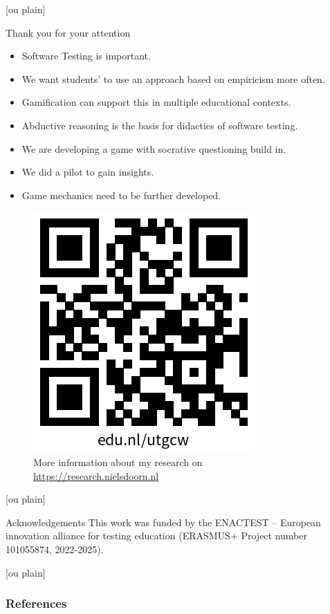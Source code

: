 \documentclass[aspectratio=169]{beamer}
\begin{document}

[ou plain]
\begin{frame}{Thank you for your attention}

\begin{itemize}
    \item Software Testing is important.
    \item We want students' to use an approach based on empiricism more often.
    \item Gamification can support this in multiple educational contexts.
    \item Abductive reasoning is the basis for didactics of software testing.
    \item We are developing a game with socrative questioning build in.
    \item We did a pilot to gain insights.
    \item Game mechanics need to be further developed.
\end{itemize}

\begin{figure}
    \centering
    \includegraphics[width=0.25\linewidth]{images//qr.png}
    \caption{More information about my research on \url{https://research.nielsdoorn.nl}}
\end{figure}
\end{frame}

[ou plain]
\begin{frame}{Acknowledgements}
    This work was funded by the ENACTEST -- European innovation alliance for testing education (ERASMUS+ Project number 101055874, 2022-2025).
\end{frame}

[ou plain]
\begin{frame}[allowframebreaks]
    \frametitle{References}
    \printbibliography
\end{frame}
\end{document}
